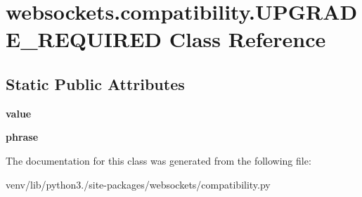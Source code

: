 \hypertarget{classwebsockets_1_1compatibility_1_1_u_p_g_r_a_d_e___r_e_q_u_i_r_e_d}{}\section{websockets.\+compatibility.\+U\+P\+G\+R\+A\+D\+E\+\_\+\+R\+E\+Q\+U\+I\+R\+ED Class Reference}
\label{classwebsockets_1_1compatibility_1_1_u_p_g_r_a_d_e___r_e_q_u_i_r_e_d}
\subsection*{Static Public Attributes}
\begin{DoxyCompactItemize}
\item 
\mbox{\label{classwebsockets_1_1compatibility_1_1_u_p_g_r_a_d_e___r_e_q_u_i_r_e_d_a0d1df437bb8c500e0787768b203fd49e}} 
{\bfseries value}
\item 
\mbox{\label{classwebsockets_1_1compatibility_1_1_u_p_g_r_a_d_e___r_e_q_u_i_r_e_d_add69728604467f2c8b9d03fe08774fc6}} 
{\bfseries phrase}
\end{DoxyCompactItemize}


The documentation for this class was generated from the following file\+:\begin{DoxyCompactItemize}
\item 
venv/lib/python3./site-\/packages/websockets/compatibility.\+py\end{DoxyCompactItemize}

